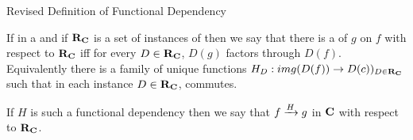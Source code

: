 \begin{frame}{Revised Definition of Functional Dependency}
\begin{definition}
If \scalebox{0.9}{\fgsourcediagram} in a \catMEterm \catcw  and if $\reqtc$ is a set of instances of \catcw
then we say that there is a   of $g$ on $f$ with respect to $\reqtc$ iff
for every $D \in \reqtc$, $D(g)$ factors through $D(f)$. \\
\medskip
Equivalently there is a family of unique functions $H_D:img(D(f)) \morph D(c))_{D \in \reqtc}$
such that in each instance $D \in \reqtc$,
 commutes.
\end{definition}

If $H$ is such a functional dependency then we say that $\fundep{H}{f}{g}$ in $\catc$ with respect to $\reqtc$.
\end{frame}

\newcommand{\representationdiagram}{
\newcommand{\myspacing}{0.15cm}
$
\begin{array}{c p{1.25cm} c c p{0.5cm} c}
            && \Rnode{b}{b}&                &&                \\[\myspacing]
            &&             &                &&\Rnode{d1}{d_1} \\[\myspacing]
            &&             &\Rnode{b1}{b_1} &&                \\[\myspacing]
            &&             &                &&\Rnode{d2}{d_2} \\[\myspacing]
\Rnode{a}{a}&&             &\Rnode{b2}{b_2} &&                \\ %
            &&             &\vdots          &&\vdots          \\
            &&             &\Rnode{bnp}{b_{n-1}} &&           \\[\myspacing]
            &&             &                &&\Rnode{dn}{d_n} \\[\myspacing]
            && \Rnode{c}{c}  
\end{array}
\begin{arrows}
\ncarr[3]{a}{b}\alabel{f}
\ncarr[-3]{a}{c}\blabel{g}
\ncarr[-5]{d1}{b}\blabel{q_1}[0.35]\idcomp
\ncarr{d1}{b1}\blabel{h_1}
\ncarr{d2}{b1}\blabel{q_2}[0.35]\idcomp
\ncarr{d2}{b2}\blabel{h_2}
\ncarr{dn}{bnp}\blabel{q_n}[0.35]\idcomp
\ncarr[5]{dn}{c}\alabel{h_n}
\end{arrows}
$
}

